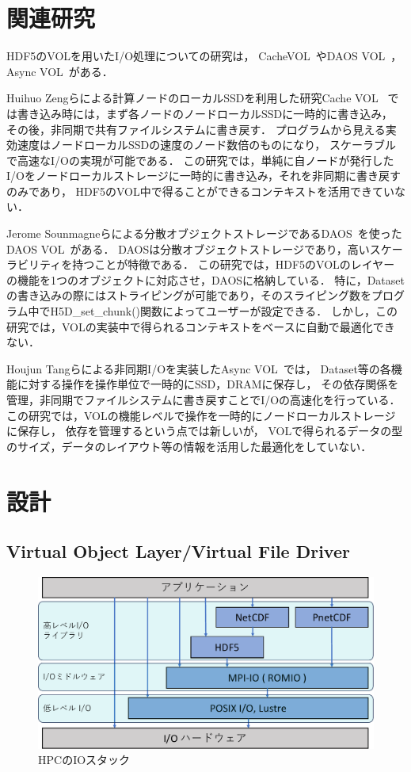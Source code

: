 \documentclass[submit,techrep,noauthor]{ipsj}
\begin{document}
\section{関連研究}

HDF5のVOLを用いたI/O処理についての研究は，
CacheVOL~\cite{zheng2022hdf5}やDAOS VOL~\cite{soumagne2021accelerating}，Async VOL~\cite{tang2021transparent}がある．

Huihuo Zengらによる計算ノードのローカルSSDを利用した研究Cache VOL~\cite{zheng2022hdf5}
では書き込み時には，まず各ノードのノードローカルSSDに一時的に書き込み，
その後，非同期で共有ファイルシステムに書き戻す．
プログラムから見える実効速度はノードローカルSSDの速度のノード数倍のものになり，
スケーラブルで高速なI/Oの実現が可能である．
この研究では，単純に自ノードが発行したI/Oをノードローカルストレージに一時的に書き込み，それを非同期に書き戻すのみであり，
HDF5のVOL中で得ることができるコンテキストを活用できていない．

Jerome Sounmagneらによる分散オブジェクトストレージであるDAOS~\cite{Breitenfeld2017DAOSFE}を使ったDAOS VOL~\cite{soumagne2021accelerating}がある．
DAOSは分散オブジェクトストレージであり，高いスケーラビリティを持つことが特徴である．
この研究では，HDF5のVOLのレイヤーの機能を1つのオブジェクトに対応させ，DAOSに格納している．
特に，Datasetの書き込みの際にはストライピングが可能であり，そのスライピング数をプログラム中でH5D\_set\_chunk()関数によってユーザーが設定できる．
しかし，この研究では，VOLの実装中で得られるコンテキストをベースに自動で最適化できない．

Houjun Tangらによる非同期I/Oを実装したAsync VOL~\cite{tang2021transparent}では，
Dataset等の各機能に対する操作を操作単位で一時的にSSD，DRAMに保存し，
その依存関係を管理，非同期でファイルシステムに書き戻すことでI/Oの高速化を行っている．
この研究では，VOLの機能レベルで操作を一時的にノードローカルストレージに保存し，
依存を管理するという点では新しいが，
VOLで得られるデータの型のサイズ，データのレイアウト等の情報を活用した最適化をしていない．


\section{設計}
\subsection{Virtual Object Layer/Virtual File Driver}
\begin{figure}[t]
	\centering
	\includegraphics[page=1,width=\linewidth]{figure-crop.pdf}
	\caption{HPCのIOスタック}
	\label{fig:iotstack}
\end{figure}
\end{document}
